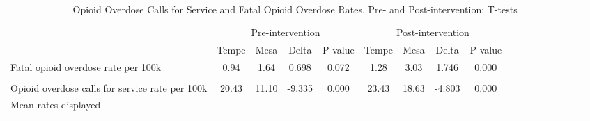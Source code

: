 \begin{table}[htbp]\centering
\def\sym#1{\ifmmode^{#1}\else\(^{#1}\)\fi}
\caption{Opioid Overdose Calls for Service and Fatal Opioid Overdose Rates, Pre- and Post-intervention: T-tests}
\begin{adjustbox}{max width=\linewidth}\begin{tabular}{l*{4}{cccc}}
\toprule
                    &\multicolumn{4}{c}{Pre-intervention}               &\multicolumn{4}{c}{Post-intervention} \\
                    &       Tempe&        Mesa&       Delta&     P-value&       Tempe&        Mesa&       Delta&     P-value \\
\midrule
Fatal opioid overdose rate per 100k&        0.94&        1.64&       0.698&       0.072&        1.28&        3.03&       1.746&       0.000 \\  
\vspace{.025em} \\
Opioid overdose calls for service rate per 100k&       20.43&       11.10&      -9.335&       0.000&       23.43&       18.63&      -4.803&     0.000 \\
\bottomrule
\multicolumn{8}{l}{\footnotesize Mean rates displayed}\\
\end{tabular} \end{adjustbox}
\end{table}
